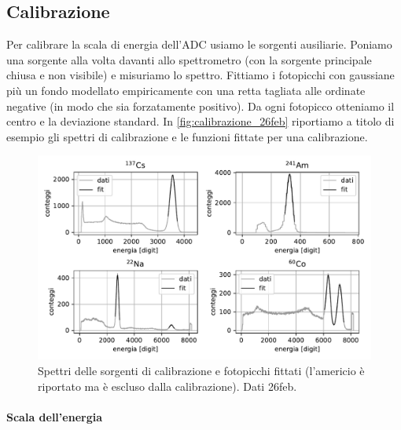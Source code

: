 \subsection{Calibrazione}\label{par:fondo1}

Per calibrare la scala di energia dell'ADC usiamo le sorgenti ausiliarie.
Poniamo una sorgente alla volta davanti allo spettrometro (con la sorgente principale chiusa e non visibile)
e misuriamo lo spettro.
Fittiamo i fotopicchi con gaussiane più un fondo modellato empiricamente con una retta tagliata alle ordinate negative
(in modo che sia forzatamente positivo).
Da ogni fotopicco otteniamo il centro e la deviazione standard.
In \autoref{fig:calibrazione_26feb} riportiamo a titolo di esempio gli spettri di calibrazione e le funzioni fittate per una calibrazione.

\begin{figure}
	\hspace{-2.5em}
	\includegraphics[width=40em]{calibrazione_26feb}
	\caption{\label{fig:calibrazione_26feb}
		Spettri delle sorgenti di calibrazione e fotopicchi fittati (l'americio è riportato ma è escluso dalla calibrazione). Dati 26feb.}
\end{figure}

\paragraph{Scala dell'energia}

